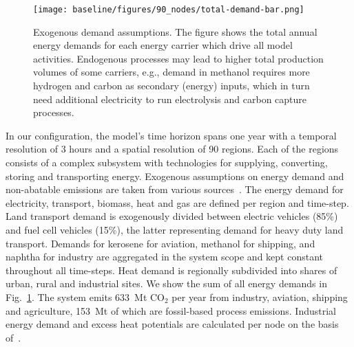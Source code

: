 \documentclass[twocolumn]{article}
\newcommand{\carbon}{CO$_2$}
\begin{document}
\begin{figure}
    \texttt{[image: baseline/figures/90\_nodes/total-demand-bar.png]}
    \caption{Exogenous demand assumptions. The figure shows the total annual energy demands for each energy carrier which drive all model activities. Endogenous processes may lead to higher total production volumes of some carriers, e.g., demand in methanol requires more hydrogen and carbon as secondary (energy) inputs, which in turn need additional electricity to run electrolysis and carbon capture processes.}
    \label{fig:total-demand-bar}
\end{figure}
%
In our configuration, the model's time horizon spans one year with a temporal resolution of 3 hours and a spatial resolution of 90 regions. Each of the regions consists of a complex subsystem with technologies for supplying, converting, storing and transporting energy. Exogenous assumptions on energy demand and non-abatable emissions are taken from various sources~\cite{piamanzGeoreferencedIndustrialSites2018,muehlenpfordtTimeSeries2019,mantzosJRCIDEES20152018,NationalEmissionsReported2023,EurostatCompleteEnergyBalance,uwekrienDemandlib2023}. The energy demand for electricity, transport, biomass, heat and gas are defined per region and time-step. Land transport demand is exogenously divided between electric vehicles (85\%) and fuel cell vehicles (15\%), the latter representing demand for heavy duty land transport. Demands for kerosene for aviation, methanol for shipping, and naphtha for industry are aggregated in the system scope and kept constant throughout all time-steps. Heat demand is regionally subdivided into shares of urban, rural and industrial sites. We show the sum of all energy demands in Fig.~\ref{fig:total-demand-bar}. The system emits 633~Mt \carbon{} per year from industry, aviation, shipping and agriculture, 153~Mt of which are fossil-based process emissions. Industrial energy demand and excess heat potentials are calculated per node on the basis of~\cite{hotmaps_industrial_db}.
\end{document}
